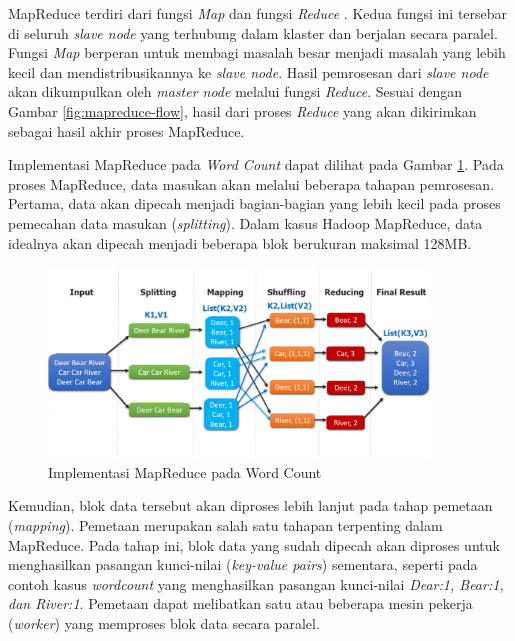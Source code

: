 MapReduce terdiri dari fungsi \textit{Map} dan fungsi \textit{Reduce} \cite{gandomiHybSMRPHybridScheduling2019}. Kedua fungsi ini tersebar di seluruh \textit{slave node} yang terhubung dalam klaster dan berjalan secara paralel. Fungsi \textit{Map} berperan untuk membagi masalah besar menjadi masalah yang lebih kecil dan mendistribusikannya ke \textit{slave node}. Hasil pemrosesan dari \textit{slave node} akan dikumpulkan oleh \textit{master node} melalui fungsi \textit{Reduce}. Sesuai dengan Gambar \ref{fig:mapreduce-flow}, hasil dari proses \textit{Reduce} yang akan dikirimkan sebagai hasil akhir proses MapReduce.  

Implementasi MapReduce pada \textit{Word Count}\cite{KOMPARASIKECEPATANHADOOP} dapat dilihat pada Gambar \ref{fig:mapreduce-wordcount}. Pada proses MapReduce, data masukan akan melalui beberapa tahapan pemrosesan. Pertama, data akan dipecah menjadi bagian-bagian yang lebih kecil pada proses pemecahan data masukan (\textit{splitting}). Dalam kasus Hadoop MapReduce, data idealnya akan dipecah menjadi beberapa blok berukuran maksimal 128MB.

\begin{figure}[h!]
    \centering
    \includegraphics[width=0.9\textwidth]{figures/ch02/map-reduce-word-count-oreilly.png}
    \caption{Implementasi MapReduce pada Word Count \cite{MapReduceDistributedComputing}}
    \label{fig:mapreduce-wordcount}
\end{figure}

Kemudian, blok data tersebut akan diproses lebih lanjut pada tahap pemetaan (\textit{mapping}). Pemetaan merupakan salah satu tahapan terpenting dalam MapReduce. Pada tahap ini, blok data yang sudah dipecah akan diproses untuk menghasilkan pasangan kunci-nilai (\textit{key-value pairs}) sementara, seperti pada contoh kasus \textit{wordcount} yang menghasilkan pasangan kunci-nilai \textit{Dear:1, Bear:1, dan River:1}. Pemetaan dapat melibatkan satu atau beberapa mesin pekerja (\textit{worker}) yang memproses blok data secara paralel.

